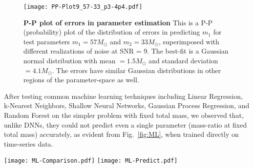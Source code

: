 \documentclass[aps,prd,%
amsmath,floats,floatfix, twocolumn, superscriptaddress,nofootinbib,showpacs]{revtex4-1}
\begin{document}
\begin{figure}
	
	\hspace{-.25in}	\texttt{[image: PP-Plot9\_57-33\_p3-4p4.pdf]}
	\caption{\textbf{P-P plot of errors in parameter estimation} This is a P-P (probability) plot of the distribution of errors in predicting $m_1$ for test  parameters $m_1=57M_{\odot}$ and $m_2=33M_{\odot}$, superimposed with different realizations of noise at SNR = 9. The best-fit is a Gaussian normal distribution with mean $=1.5M_{\odot}$ and standard deviation $=4.1M_{\odot}$. The errors have similar Gaussian distributions in other regions of the parameter-space as well. }
	\label{fig:PPplot}
\end{figure}

\noindent After testing common machine learning techniques including Linear Regression, k-Nearest Neighbors, Shallow Neural Networks, Gaussian Process Regression, and Random Forest on the simpler problem with fixed total mass, we observed that, unlike DNNs, they could not predict even a single parameter (mass-ratio at fixed total mass) accurately, as evident from Fig.~\ref{fig:ML}, when trained directly on time-series data.

\begin{figure*}
	\centerline{
		\texttt{[image: ML-Comparison.pdf]}\hspace{2.1em}
		\texttt{[image: ML-Predict.pdf]}
	}

	\caption{\textbf{Comparison with other methods.} Left panel: This is the accuracy of different machine learning methods for detection after training each with roughly 8000 elements, half of which contained noisy signals with a fixed peak power, less than the background noise, and constant total mass, with the other half being pure noise with unit standard deviation.%
		An accuracy of 50\% can be obtained by randomly guessing. Right panel: This is the mean relative error obtained by various machine learning algorithms for predicting a single parameter, i.e., mass-ratio, using a training set containing about 8000 signals with fixed amplitude = 0.6 added to white noise with unit standard deviation. Note that scaling these methods to predict multiple parameters is often difficult, whereas it simply involves adding neurons to the final layer of neural networks.}
	\label{fig:ML}
\end{figure*}
\end{document}
